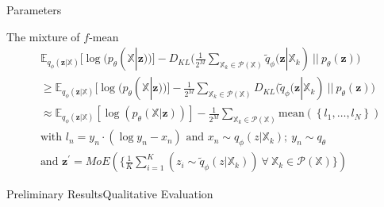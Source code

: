 
\begin{frame}{Parameters}

\end{frame}



\begin{frame}{The mixture of $f$-mean}
\begin{equation*}
        \begin{split}
        & \mathbb{E}_{q_{\phi}(\textbf{z}|\mathbb{X})}[\log (p_{\theta}(\mathbb{X}|\textbf{z}))] - D_{KL}\biggl( \frac{1}{2^M} \sum _{\mathbb{X}_k \in \mathcal{P}(\mathbb{X})} \tilde{q}_{\phi}(\textbf{z}|\mathbb{X}_k)\ ||\ p_{\theta}(\textbf{z})\biggr)\\
        & \geq \mathbb{E}_{q_{\phi}(\textbf{z}|\mathbb{X})}[\log (p_{\theta}(\mathbb{X}|\textbf{z}))] - \frac{1}{2^M} \sum _{\mathbb{X}_k \in \mathcal{P}(\mathbb{X})}  D_{KL}\biggl(  \tilde{q}_{\phi}(\textbf{z}|\mathbb{X}_k)\ ||\ p_{\theta}(\textbf{z})\biggr) \\
        & \approx \mathbb{E}_{q_{\phi}(\textbf{z}|\mathbb{X})}[\log (p_{\theta}(\mathbb{X}|\textbf{z}))] -\frac{1}{2^M} \sum _{\mathbb{X}_k \in \mathcal{P}(\mathbb{X})}\text{mean}(\left\{ l_1,\ldots,l_N \right\}) \\
        & \text{with } l_n=y_n\cdot(\log y_n -x_n) \text{ and } x_n \sim q_{\phi}(z|\mathbb{X}_k);\ y_n \sim q_{\theta}\\
        & \text{and } \textbf{z} ^{\prime} = MoE(\{\frac{1}{K} \sum ^K _{i=1} (z_i \sim \tilde{q}_{\phi}(z|\mathbb{X}_k))\ \forall\ \mathbb{X}_k \in \mathcal{P}(\mathbb{X})\})
    \end{split}
\end{equation*}
\end{frame}



\begin{frame}{Preliminary Results}{Qualitative Evaluation}
    \begin{figure}
        \centering
    \end{figure}
\end{frame}

